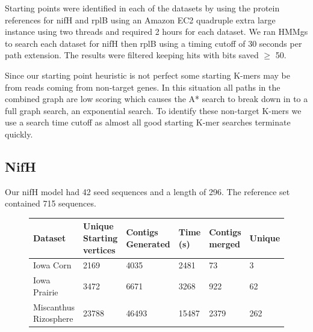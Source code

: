 \documentclass{article}
\begin{document}
Starting points were identified in each of the datasets by using the protein references for nifH and rplB using an Amazon EC2 quadruple extra large instance using two threads and required 2 hours for each dataset. We ran HMMgs to search each dataset for nifH then rplB using a timing cutoff of 30 seconds per path extension. The results were filtered keeping hits with bits saved $\ge$ 50.

Since our starting point heuristic is not perfect some starting K-mers may be from reads coming from non-target genes.  In this situation all paths in the combined graph are low scoring which causes the A* search to break down in to a full graph search, an exponential search.  To identify these non-target K-mers we use a search time cutoff as almost all good starting K-mer searches terminate quickly.

\subsection{NifH}
Our nifH model had 42 seed sequences and a length of 296.  The reference set contained 715 sequences.

\begin{figure}
\begin{tabular}{| p{17mm} | p{15mm} | l | l | l | l |}
\hline
Dataset & Unique Starting vertices & Contigs Generated & Time (s) & Contigs merged & Unique\\
\hline
Iowa Corn & 2169 & 4035 & 2481 & 73 & 3 \\
\hline
Iowa Prairie & 3472 & 6671 & 3268 & 922 & 62 \\
\hline
Miscanthus Rizosphere & 23788 & 46493 & 15487 & 2379 & 262 \\
\hline
\end{tabular}
\end{figure}
\end{document}
